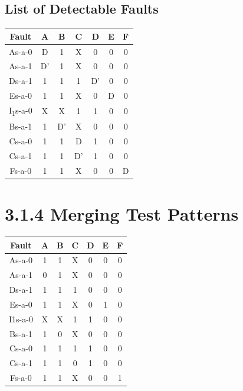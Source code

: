 \documentclass[11pt]{report}
\begin{document}
\subsection*{List of Detectable Faults}
\begin{tabular}{|c||c|c|c|c|c|c|}
    \hline
    Fault & A & B & C & D & E & F
    \\
    \hline
    \hline
    As-a-0 & D & 1 & X & 0 & 0 & 0 \\
    \hline
    As-a-1 & D' & 1 & X & 0 & 0 & 0 \\
    \hline
    Ds-a-1 & 1 & 1 & 1 & D' & 0 & 0 \\
    \hline
    Es-a-0 & 1 & 1 & X & 0 & D & 0 \\
    \hline
    I\textsubscript{1}s-a-0 & X & X & 1 & 1 & 0 & 0 \\
    \hline
    Bs-a-1 & 1 & D' & X & 0 & 0 & 0 \\
    \hline
    Cs-a-0 & 1 & 1 & D & 1 & 0 & 0 \\
    \hline
    Cs-a-1 & 1 & 1 & D' & 1 & 0 & 0 \\
    \hline
    Fs-a-0 & 1 & 1 & X & 0 & 0 & D \\
    \hline
\end{tabular}



\section*{3.1.4 Merging Test Patterns}
\begin{tabular}{|c||c|c|c|c|c|c|}
\hline
Fault & A & B & C & D & E & F \\
\hline
\hline
\rowcolor{green!50}As-a-0 & 1 & 1 & X & 0 & 0 & 0 \\
\hline
As-a-1 & 0 & 1 & X & 0 & 0 & 0 \\
\hline
\rowcolor{green!50}Ds-a-1 & 1 & 1 & 1 & 0 & 0 & 0 \\
\hline
Es-a-0 & 1 & 1 & X & 0 & 1 & 0 \\
\hline
\rowcolor{yellow!50}I1s-a-0 & X & X & 1 & 1 & 0 & 0 \\
\hline
Bs-a-1 & 1 & 0 & X & 0 & 0 & 0 \\
\hline
\rowcolor{yellow!50}Cs-a-0 & 1 & 1 & 1 & 1 & 0 & 0 \\
\hline
Cs-a-1 & 1 & 1 & 0 & 1 & 0 & 0 \\
\hline
Fs-a-0 & 1 & 1 & X & 0 & 0 & 1 \\
\hline
\end{tabular}
\end{document}
